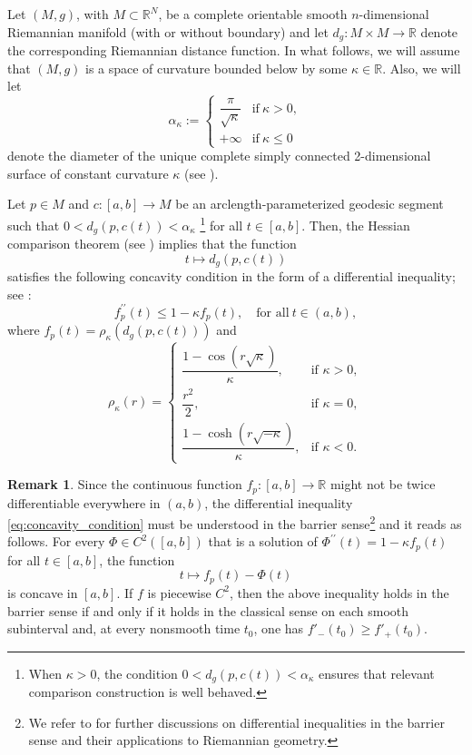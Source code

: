 \documentclass[11pt]{article}
\theoremstyle{definition}
\newtheorem{remark}[definition]{Remark}
\theoremstyle{remark}
\theoremstyle{plain}
\newcommand{\R}{\mathbb{R}}
\begin{document}
Let $(M,g)$, with $M\subset \R^N$, be a complete orientable smooth $n$-dimensional Riemannian manifold (with or without boundary) and let $d_g: M\times M \rightarrow \R$ denote the corresponding Riemannian distance function.  In what follows, we will assume that $(M,g)$ is a space of curvature bounded below by some $\kappa\in \R$. Also, we will let
$$\alpha_\kappa :=\begin{cases} \dfrac{\pi}{\sqrt{\kappa}} &\text{if}\ \kappa>0,\\  +\infty &\text{if}\ \kappa\leq 0\end{cases}$$
denote the diameter of the unique complete simply connected 2-dimensional surface of constant curvature $\kappa$ (see \cite{LeeRiemannian}).

Let $p\in M$ and $c:[a,b]\rightarrow M$ be an arclength-parameterized geodesic segment such that $0<d_{g}(p,c(t))< \alpha_\kappa$ \footnote{When $\kappa>0$, the condition $0<d_g(p,c(t))<\alpha_\kappa$ ensures that relevant comparison construction is well behaved.} for all $t\in [a,b]$. Then, the Hessian comparison theorem (see \cite[Theorem 11.7]{LeeRiemannian}) implies that the function
$$t\mapsto d_{g}(p,c(t))$$
satisfies the following concavity condition in the form of a differential inequality; see \cite{PetruninSemiconcave}:
\begin{equation}\label{eq:concavity_condition}
    f_p^{\prime\prime}(t)\leq 1- \kappa f_p(t), \quad \text{for all}\ t\in (a,b),
\end{equation}
where $f_p(t) = \rho_\kappa(d_{g}(p,c(t)))$ and 
\begin{equation*}
\rho_\kappa(r) =\begin{cases}
    \dfrac{1-\cos(r\sqrt{\kappa})}{\kappa}, & \mbox{if } \kappa>0, \\
    \dfrac{r^2}{2}, & \mbox{if } \kappa=0, \\
    \dfrac{1-\cosh(r\sqrt{-\kappa})}{\kappa}, & \mbox{if } \kappa<0.
  \end{cases}
\end{equation*}

\begin{remark}

Since the continuous function $f_p:[a,b]\rightarrow \R$ might not be twice differentiable everywhere in $(a,b)$, the differential inequality \cref{eq:concavity_condition} must be understood in the barrier sense\footnote{We refer to \cite{manteg} for further discussions on differential inequalities in the barrier sense and their applications to Riemannian geometry.} and it reads as follows. For every $\Phi\in C^2([a,b])$ that is a solution of $\Phi^{\prime\prime}(t) = 1-\kappa f_p(t)$ for all $t\in [a,b]$, the function
$$t\mapsto f_p(t)-\Phi(t)$$
is concave in $[a,b]$. If $f$ is piecewise $C^2$, then the above inequality holds in the barrier sense if and only if it holds in the classical sense on each smooth subinterval and, at every nonsmooth time $t_0$, one has $f'_-(t_0)\geq f'_+(t_0)$.

\end{remark}
\end{document}
